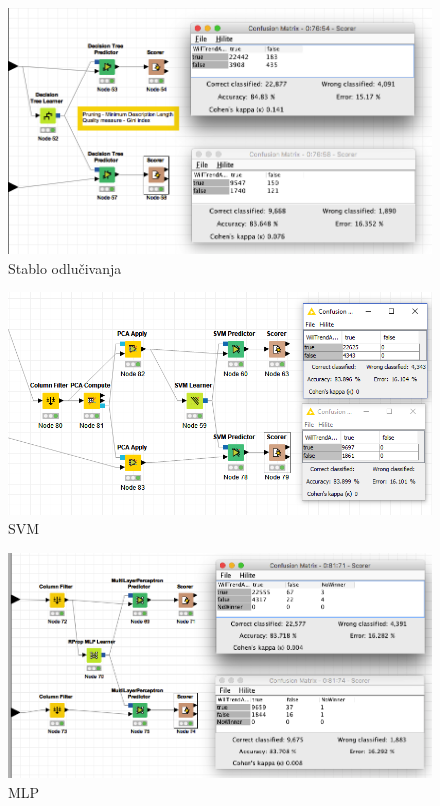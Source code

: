\documentclass[a4paper]{article}
\theoremstyle{definition}
\begin{document}

\begin{figure}[H]
\begin{center}
    \includegraphics[width=1\textwidth]{decision_tree.png}
    \caption{Stablo odlučivanja}
\end{center}
\label{fig:stabloOdlucivanja}
\end{figure}

\begin{figure}[H]
\begin{center}
    \includegraphics[width=1\textwidth]{SVM.png}
    \caption{SVM}
\end{center}
\label{fig:SVM}
\end{figure}

\begin{figure}[H]
\begin{center}
    \includegraphics[width=1\textwidth]{MLP.png}
    \caption{MLP}
\end{center}
\label{fig:MLP}
\end{figure}
\end{document}
